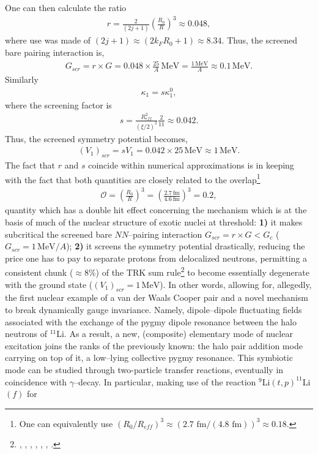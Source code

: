 \begin{subappendices}
  One can then calculate the ratio
    \begin{align}
r=\frac{2}{(2j+1)}\left(\frac{R_0}{R}\right)^3\approx 0.048,
   \end{align}
 where use was made of $(2j+1)\approx (2k_FR_0+1)\approx 8.34$. Thus, the screened bare pairing interaction is,
\begin{align}
G_{scr}=r\times G=0.048\times\frac{25}{A}\, \text{MeV}=\frac{1\,\text{MeV}}{A}\approx 0.1\,\text{MeV}.
\end{align}
 Similarly
 \begin{align}
\kappa_1=s\kappa_1^0,
 \end{align}
 where the screening factor is 
  \begin{align}
s=\frac{R_{eff}^2}{\left(\xi/2\right)^2}\frac{2}{11}\approx 0.042.
  \end{align}
Thus, the screened symmetry potential becomes,
  \begin{align}
(V_1)_{scr}=sV_1=0.042\times 25\, \text{MeV}\approx1\,\text{MeV}.
  \end{align}
The fact that $r$ and $s$ coincide within numerical approximations is in keeping with the fact that both quantities are closely related to the overlap\footnote{One can equivalently use $\left(R_0/R_{eff}\right)^3\approx\left( 2.7\text{ fm}/(4.8\text{ fm})\right)^3\approx0.18$.}
  \begin{align}
\mathcal{O}=\left(\frac{R_0}{R}\right)^3=\left(\frac{2.7\,\text{fm}}{4.6\,\text{fm}}\right)^3=0.2,
  \end{align}
quantity which has a double hit effect concerning the mechanism which is at the basis of much of the nuclear structure of exotic nuclei at threshold: \textbf{1)} it makes subcritical the screened bare $NN$--pairing interaction $G_{scr}=r\times G<G_c$ ($G_{scr}=1\,\text{MeV}/A$); \textbf{2)} it screens the symmetry potential drastically, reducing the price one has to pay to separate protons from delocalized neutrons, permitting a consistent chunk ($\approx 8$\%) of the TRK sum rule\footnote{\cite{Zinser:97}, \cite{Nakamura:06}, \cite{Shimoura:95}, \cite{Ieki:93}, \cite{Sackett:93}, \cite{Kanungo:15}, \cite{Kobayashi:89}.} to  become essentially degenerate with the  ground state ($(V_1)_{scr}=1 \,\text{MeV}$). In other words,  allowing for, allegedly, the first nuclear example of a van der Waals Cooper pair and a novel mechanism to break dynamically gauge invariance. Namely, dipole--dipole fluctuating fields associated with the exchange of the pygmy dipole resonance between the halo neutrons of $^{11}$Li. As a result, a new, (composite) elementary mode of nuclear excitation joins the ranks of the previously known: the halo pair addition mode carrying on top of it, a low--lying collective pygmy resonance. This symbiotic mode can be studied through two-particle transfer reactions, eventually in coincidence with $\gamma$--decay. In particular, making use of the reaction $^{9}$Li$(t,p)^{11}$Li$(f)$ for 

\end{subappendices}
